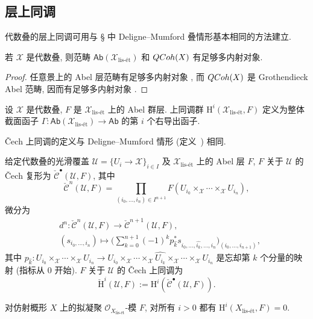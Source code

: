 \subsection{层上同调}\label{src:7.1.5-subsection}
代数叠的层上同调可用与 \S{} 中 Deligne--Mumford 叠情形基本相同的方法建立.
\begin{lemma}\label{src:7.1.23}
若 $\mathcal X$ 是代数叠, 则范畴 $\mathsf{Ab}(\mathcal X_{\text{lis-ét}})$ 和 $QCoh(X)$ 有足够多内射对象.
\end{lemma}
\begin{proof}
任意景上的 Abel 层范畴有足够多内射对象 \cite[Tag 01DP]{SP}, 而 $QCoh(X)$ 是 Grothendieck Abel 范畴, 因而有足够多内射对象 \cite[Tag 079H]{SP}.
\end{proof}
\begin{definition}[上同调]\label{src:7.1.24}
设 $\mathcal X$ 是代数叠, $F$ 是 $\mathcal X_{\text{lis-ét}}$ 上的 Abel 群层. 上同调群 $\mathrm H^i(\mathcal X_{\text{lis-ét}},F)$ 定义为整体截面函子 $\Gamma:\mathsf{Ab}(\mathcal X_{\text{lis-ét}})\to\mathsf{Ab}$ 的第 $i$ 个右导出函子.
\end{definition}
Čech 上同调的定义与 Deligne--Mumford 情形 (定义~) 相同.
\begin{definition}\label{src:7.1.25}
给定代数叠的光滑覆盖 $\mathcal U=\{U_i\to\mathcal X\}_{i\in I}$ 及 $\mathcal X_{\text{lis-ét}}$ 上的 Abel 层 $F$, $F$ 关于 $\mathcal U$ 的 Čech 复形为 $\check{\mathcal C}^{\bullet}(\mathcal U,F)$, 其中
\[
\check{\mathcal C}^n(\mathcal U,F)=\prod_{(i_0,\ldots,i_n)\in I^{n+1}}F(U_{i_0}\times_{\mathcal X}\cdots\times_{\mathcal X}U_{i_n}),
\]
微分为
\[
\begin{aligned}
&d^n:\check{\mathcal C}^n(\mathcal U,F)\longrightarrow\check{\mathcal C}^{n+1}(\mathcal U,F),\\
&(s_{i_0,\ldots,i_n})\longmapsto\biggl(\sum_{k=0}^{n+1}(-1)^kp_{\widehat k}^*s_{i_0,\ldots,\widehat{i_k},\ldots,i_n}\biggr)_{(i_0,\ldots,i_{n+1})},
\end{aligned}
\]
其中 $p_{\widehat k}:U_{i_0}\times_{\mathcal X}\cdots\times_{\mathcal X}U_{i_n}\to U_{i_0}\times_{\mathcal X}\cdots\times_{\mathcal X}\widehat{U_{i_k}}\times_{\mathcal X}\cdots\times_{\mathcal X}U_{i_n}$ 是忘却第 $k$ 个分量的映射 (指标从 $0$ 开始). $F$ 关于 $\mathcal U$ 的 Čech 上同调为
\[
\check{\mathrm H}^i(\mathcal U,F):=\mathrm H^i(\check{\mathcal C}^{\bullet}(\mathcal U,F)).
\]
\end{definition}
\begin{theorem}\label{src:7.1.26}
对仿射概形 $X$ 上的拟凝聚 $\mathcal O_{X_{\text{lis-ét}}}$-模 $F$, 对所有 $i>0$ 都有 $\mathrm H^i(X_{\text{lis-ét}},F)=0$.
\end{theorem}
